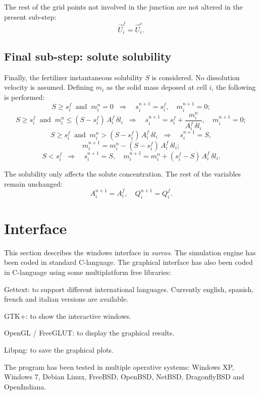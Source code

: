 \documentclass[review,authoryear]{elsarticle}
\newcommand{\eq}[2]{\begin{equation}\label{#2}#1\end{equation}}
\newcommand{\PA}[1] {\left(#1\right)}
\begin{document}
The rest of the grid points not involved in the junction are not altered in the
present sub-step:
\eq{\vec{U}_i^f=\vec{U}_i^e.}{EqJunctionPoint}

\subsection{Final sub-step: solute solubility}

Finally, the fertilizer instantaneous solubility $S$ is considered. No
dissolution velocity is assumed. Defining $m_i$ as the solid mass deposed at
cell $i$, the following is performed:
\[
	S\geq s_i^f\;\;\mathrm{and}\;\;m_i^n=0\;\;\Rightarrow\quad
	s_i^{n+1}=s_i^f,\quad m_i^{n+1}=0;
\]
\[
	S\geq s_i^f\;\;\mathrm{and}\;\;m_i^n\leq\PA{S-s_i^f}\,A_i^f\,\delta l_i\;\;
	\Rightarrow\quad
	s_i^{n+1}=s_i^f+\frac{m_i^n}{A_i^f\,\delta l_i},\quad m_i^{n+1}=0;
\]
\[
	S\geq s_i^f\;\;\mathrm{and}\;\;m_i^n>\PA{S-s_i^f}\,A_i^f\,\delta l_i\;\;
	\Rightarrow\quad s_i^{n+1}=S,
\]
\[m_i^{n+1}=m_i^n-\PA{S-s_i^f}\,A_i^f\,\delta l_i;\]
\eq
{
	S<s_i^f\;\;\Rightarrow\quad
	s_i^{n+1}=S,\quad m_i^{n+1}=m_i^n+\PA{s_i^f-S}\,A_i^f\,\delta l_i.
}{EqSolubility}

The solubility only affects the solute concentration. The rest of the variables
remain unchanged:
\eq{A_i^{n+1}=A_i^f,\quad Q_i^{n+1}=Q_i^f.}{EqSolubilityPoint}

\section{Interface}

This section describes the windows interface in \emph{surcos}. The simulation
engine has been coded in standard C-language. The graphical interface has also
been coded in C-language using some multiplatform free libraries:
\begin{description}
\item{Gettext}: to support different international languages. Currently english,
	spanish, french and italian versions are available.
\item{GTK+}: to show the interactive windows.
\item{OpenGL / FreeGLUT}: to display the graphical results.
\item{Libpng}: to save the graphical plots.
\end{description}
The program has been tested in multiple operative systems: Windows
XP\footnotemark[1], Windows 7\footnotemark[1], Debian Linux, FreeBSD, OpenBSD,
NetBSD, DragonflyBSD and OpenIndiana.
\end{document}
